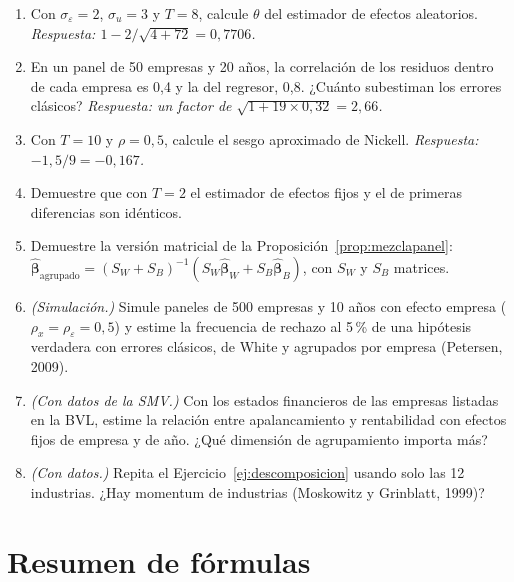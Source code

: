 \begin{enumerate}[label=\textbf{\thechapter.\arabic*},leftmargin=*,itemsep=6pt]
  \item Con $\sigma_\varepsilon=2$, $\sigma_u=3$ y $T=8$, calcule $\theta$ del estimador de efectos aleatorios. \textit{Respuesta:
  $1-2/\sqrt{4+72}=0{,}7706$.}

  \item En un panel de 50 empresas y 20 años, la correlación de los residuos dentro de cada empresa es 0,4 y la del regresor, 0,8.
  ¿Cuánto subestiman los errores clásicos? \textit{Respuesta: un factor de $\sqrt{1+19\times0{,}32}=2{,}66$.}

  \item Con $T=10$ y $\rho=0{,}5$, calcule el sesgo aproximado de Nickell. \textit{Respuesta: $-1{,}5/9=-0{,}167$.}

  \item Demuestre que con $T=2$ el estimador de efectos fijos y el de primeras diferencias son idénticos.

  \item Demuestre la versión matricial de la Proposición~\ref{prop:mezclapanel}:
  $\hat{\boldsymbol\beta}_{\text{agrupado}}=(S_W+S_B)^{-1}(S_W\hat{\boldsymbol\beta}_W+S_B\hat{\boldsymbol\beta}_B)$, con $S_W$ y $S_B$ matrices.

  \item \emph{(Simulación.)} Simule paneles de 500 empresas y 10 años con efecto empresa ($\rho_x=\rho_\varepsilon=0{,}5$) y estime la frecuencia de
  rechazo al 5\,\% de una hipótesis verdadera con errores clásicos, de White y agrupados por empresa (Petersen, 2009).

  \item \emph{(Con datos de la SMV.)} Con los estados financieros de las empresas listadas en la BVL, estime la relación entre
  apalancamiento y rentabilidad con efectos fijos de empresa y de año. ¿Qué dimensión de agrupamiento importa más?

  \item \emph{(Con datos.)} Repita el Ejercicio~\ref{ej:descomposicion} usando solo las 12 industrias. ¿Hay momentum de industrias
  (Moskowitz y Grinblatt, 1999)?
\end{enumerate}

\section{Resumen de fórmulas}

